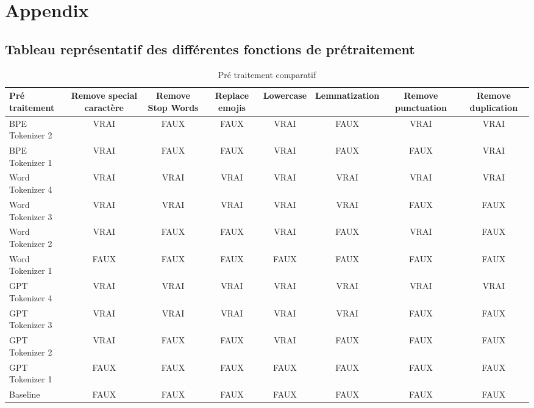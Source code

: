 \chapter{Appendix}
\label{chap:appendix_tokenizer}

\section*{Tableau représentatif des différentes fonctions de prétraitement}
\begin{table}[ht]
    \centering
    \begin{adjustbox}{max width=\textwidth}
    \renewcommand{\arraystretch}{1.5} %
    \setlength{\tabcolsep}{6pt} %
    \begin{tabular}{|p{3.5cm}|c|c|c|c|c|c|c|}
        \hline
        \textbf{Pré traitement} & \textbf{Remove special caractère} & \textbf{Remove Stop Words} & \textbf{Replace emojis} & \textbf{Lowercase} & \textbf{Lemmatization} & \textbf{Remove punctuation} & \textbf{Remove duplication} \\
        \hline
        BPE Tokenizer 2  & VRAI & FAUX & FAUX & VRAI & FAUX & VRAI & VRAI \\
        BPE Tokenizer 1  & VRAI & FAUX & FAUX & VRAI & FAUX & FAUX & VRAI \\
        Word Tokenizer 4  & VRAI & VRAI & VRAI & VRAI & VRAI & VRAI & VRAI \\
        Word Tokenizer 3 & VRAI & VRAI & VRAI & VRAI & VRAI & FAUX & FAUX \\
        Word Tokenizer 2  & VRAI & FAUX & FAUX & VRAI & FAUX & VRAI & FAUX \\
        Word Tokenizer 1  & FAUX & FAUX & FAUX & FAUX & FAUX & FAUX & FAUX \\
        GPT Tokenizer 4  & VRAI & VRAI & VRAI & VRAI & VRAI & VRAI & VRAI \\
        GPT Tokenizer 3 & VRAI & VRAI & VRAI & VRAI & VRAI & FAUX & FAUX \\
        GPT Tokenizer 2  & VRAI & FAUX & FAUX & VRAI & FAUX & FAUX & FAUX \\
        GPT Tokenizer 1 & FAUX & FAUX & FAUX & FAUX & FAUX & FAUX & FAUX \\
        Baseline & FAUX & FAUX & FAUX & FAUX & FAUX & FAUX & FAUX \\
        \hline
    \end{tabular}
    \end{adjustbox}
    \caption{Pré traitement comparatif}
    \label{tab:pre_treatment_comparative}
\end{table}